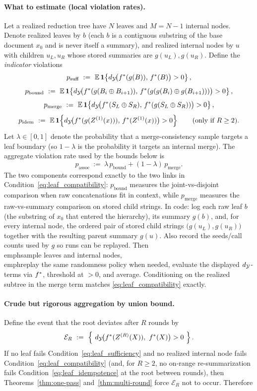 \paragraph{What to estimate (local violation rates).}
Let a realized reduction tree have $N$ leaves and $M=N-1$ internal nodes. Denote realized
leaves by $b$ (each $b$ is a contiguous substring of the base document $x_0$ and is never itself a summary), and realized internal nodes by $u$ with children $u_L,u_R$ whose stored summaries are $g(u_L),g(u_R)$. Define the \emph{indicator} violations
\[
p_{\text{suff}}\ :=\ \E\,\mathbf{1}\!\left\{\metric\!\big(\fstar(g(B)),\,\fstar(B)\big)>0\right\},
\]
\[
p_{\text{bound}}\ :=\ \E\,\mathbf{1}\!\left\{\metric\!\big(\fstar(g(B_i\concat B_{i+1})),\,\fstar(g(g(B_i)\concat g(B_{i+1})))\big)>0\right\},
\]
\[
p_{\text{merge}}\ :=\ \E\,\mathbf{1}\!\left\{\metric\!\big(\fstar(S_L\concat S_R),\,\fstar(g(S_L\concat S_R))\big)>0\right\},
\]
\[
p_{\text{idem}}\ :=\ \E\,\mathbf{1}\!\left\{\metric\!\big(\fstar(g(Z^{(1)}(x))),\,\fstar(Z^{(1)}(x))\big)>0\right\}\qquad\text{(only if $R\ge2$).}
\]
Let $\lambda\in[0,1]$ denote the probability that a merge-consistency sample targets a leaf boundary (so $1-\lambda$ is the probability it targets an internal merge). The aggregate violation rate used by the bounds below is
\[
p_{\text{assoc}}\ :=\ \lambda\,p_{\text{bound}} + (1-\lambda)\,p_{\text{merge}}.
\]
The two components correspond exactly to the two links in Condition~\eqref{eq:leaf_compatibility}: $p_{\text{bound}}$ measures the joint-vs-disjoint comparison when raw concatenations fit in context, while $p_{\text{merge}}$ measures the raw-vs-summary comparison on stored child strings.
In code: log each raw leaf $b$ (the substring of $x_0$ that entered the hierarchy), its summary $g(b)$, and, for every internal node, the ordered pair of stored child strings $\big(g(u_L),g(u_R)\big)$ together with the resulting parent summary $g(u)$. Also record the seeds/call counts used by $g$ so runs can be replayed. Then \\emph{sample} leaves and internal nodes, \\emph{replay} the same randomness policy when needed, evaluate the displayed $d_{\mathcal{Y}}$-terms via $f^{\ast}$, threshold at $>0$, and average. Conditioning on the realized subtree in the merge term matches \eqref{eq:leaf_compatibility} exactly.

\paragraph{Crude but rigorous aggregation by union bound.}
Define the event that the root deviates after $R$ rounds by
\[
\mathcal{E}_R\ :=\ \left\{\ \metric\!\big(\fstar(Z^{(R)}(X)),\ \fstar(X)\big)>0\ \right\}.
\]
If no leaf fails Condition~\eqref{eq:leaf_sufficiency} and no realized internal node fails Condition~\eqref{eq:leaf_compatibility} (and, for $R\ge2$, no on‑range
re‑summarization fails Condition~\eqref{eq:leaf_idempotence} at the root between rounds), then Theorems~\ref{thm:one-pass}
and~\ref{thm:multi-round} force $\mathcal{E}_R$ not to occur. Therefore

